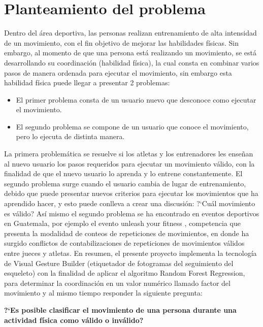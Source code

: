 \chapter{Planteamiento del problema}
Dentro del \'area deportiva, las personas realizan entrenamiento de alta intensidad de un movimiento, con el fin objetivo de mejorar las habilidades f\'isicas. Sin embargo, al momento de que una persona est\'a realizando un movimiento, se est\'a desarrollando su coordinaci\'on (habilidad f\'isica), la cual consta en combinar varios pasos de manera ordenada para ejecutar el movimiento, sin embargo esta habilidad f\'isica puede llegar a presentar 2 problemas:
\begin{itemize}
	\item El primer problema consta de un usuario nuevo que desconoce como ejecutar el movimiento.
	\item El segundo problema se compone de un usuario que conoce el movimiento, pero lo ejecuta de distinta manera.
\end{itemize} 
La primera problem\'atica se resuelve si los atletas y los entrenadores les ense\~nan al nuevo usuario los pasos requeridos para ejecutar un movimiento v\'alido, con la finalidad de que el nuevo usuario lo aprenda y lo entrene constantemente.
\medbreak
El segundo problema surge cuando el usuario cambia de lugar de entrenamiento, debido que puede presentar nuevos criterios para ejecutar los movimientos que ha aprendido hacer, y esto puede conlleva a crear una discusi\'on: ?`Cu\'al movimiento es v\'alido?
\medbreak
\medbreak
As\'i mismo el segundo problema se ha encontrado en eventos deportivos en Guatemala, por ejemplo el evento unleash your fitness \cite{unleash}, competencia que presenta la modalidad de conteos de repeticiones de movimientos, en donde ha surgido conflictos de contabilizaciones de repeticiones de  movimientos v\'alidos entre jueces y atletas.
\medbreak
\medbreak
En resumen, el presente proyecto implementa la tecnolog\'ia de Visual Gesture Builder (etiquetador de fotogramas del seguimiento del esqueleto) con la finalidad de aplicar el algoritmo Random Forest Regression, para determinar la coordinaci\'on en un valor num\'erico llamado factor del movimiento y al mismo tiempo responder la siguiente pregunta:
\medbreak
\medbreak
\begin{center}
\textbf{?`Es posible clasificar el movimiento de una persona durante una actividad f\'isica como v\'alido o inv\'alido?}
\end{center}





